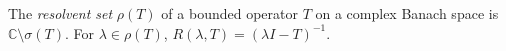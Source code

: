 
The \emph{resolvent set} $\rho(T)$ of a bounded operator $T$ on a complex Banach space is $\mathbb C\setminus\sigma(T)$. For $\lambda\in\rho(T)$, $R(\lambda,T)=(\lambda I-T)^{-1}$.
